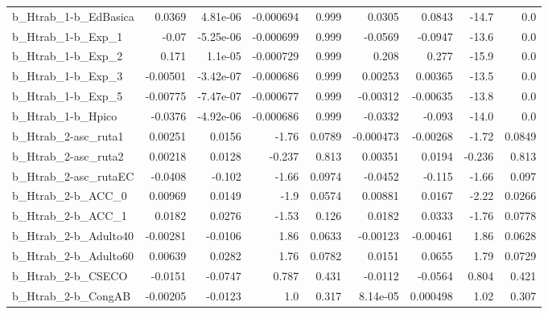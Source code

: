 \begin{tabular}{lrrrrrrrr}
b\_Htrab\_1-b\_EdBasica       &      0.0369 &     4.81e-06 & -0.000694 &    0.999 &     0.0305 &      0.0843 &        -14.7 &           0.0 \\
b\_Htrab\_1-b\_Exp\_1          &       -0.07 &    -5.25e-06 & -0.000699 &    0.999 &    -0.0569 &     -0.0947 &        -13.6 &           0.0 \\
b\_Htrab\_1-b\_Exp\_2          &       0.171 &      1.1e-05 & -0.000729 &    0.999 &      0.208 &       0.277 &        -15.9 &           0.0 \\
b\_Htrab\_1-b\_Exp\_3          &    -0.00501 &    -3.42e-07 & -0.000686 &    0.999 &    0.00253 &     0.00365 &        -13.5 &           0.0 \\
b\_Htrab\_1-b\_Exp\_5          &    -0.00775 &    -7.47e-07 & -0.000677 &    0.999 &   -0.00312 &    -0.00635 &        -13.8 &           0.0 \\
b\_Htrab\_1-b\_Hpico          &     -0.0376 &    -4.92e-06 & -0.000686 &    0.999 &    -0.0332 &      -0.093 &        -14.0 &           0.0 \\
b\_Htrab\_2-asc\_ruta1        &     0.00251 &       0.0156 &     -1.76 &   0.0789 &  -0.000473 &    -0.00268 &        -1.72 &        0.0849 \\
b\_Htrab\_2-asc\_ruta2        &     0.00218 &       0.0128 &    -0.237 &    0.813 &    0.00351 &      0.0194 &       -0.236 &         0.813 \\
b\_Htrab\_2-asc\_rutaEC       &     -0.0408 &       -0.102 &     -1.66 &   0.0974 &    -0.0452 &      -0.115 &        -1.66 &         0.097 \\
b\_Htrab\_2-b\_ACC\_0          &     0.00969 &       0.0149 &      -1.9 &   0.0574 &    0.00881 &      0.0167 &        -2.22 &        0.0266 \\
b\_Htrab\_2-b\_ACC\_1          &      0.0182 &       0.0276 &     -1.53 &    0.126 &     0.0182 &      0.0333 &        -1.76 &        0.0778 \\
b\_Htrab\_2-b\_Adulto40       &    -0.00281 &      -0.0106 &      1.86 &   0.0633 &   -0.00123 &    -0.00461 &         1.86 &        0.0628 \\
b\_Htrab\_2-b\_Adulto60       &     0.00639 &       0.0282 &      1.76 &   0.0782 &     0.0151 &      0.0655 &         1.79 &        0.0729 \\
b\_Htrab\_2-b\_CSECO          &     -0.0151 &      -0.0747 &     0.787 &    0.431 &    -0.0112 &     -0.0564 &        0.804 &         0.421 \\
b\_Htrab\_2-b\_CongAB         &    -0.00205 &      -0.0123 &       1.0 &    0.317 &   8.14e-05 &    0.000498 &         1.02 &         0.307 \\

\end{tabular}
